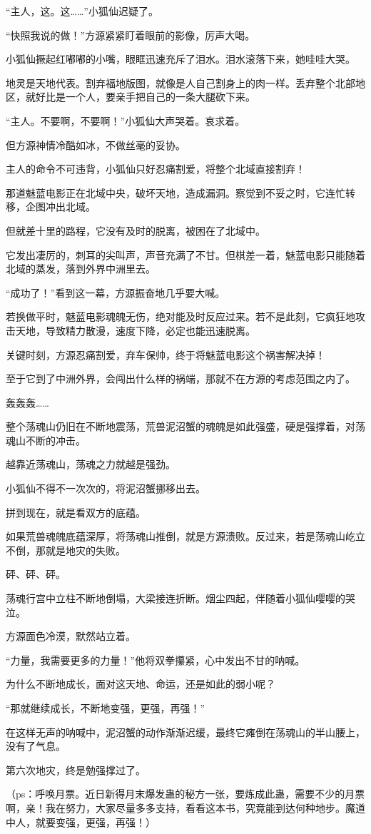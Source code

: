 \begin{this_body}
“主人，这。这……”小狐仙迟疑了。

“快照我说的做！”方源紧紧盯着眼前的影像，厉声大喝。

小狐仙撅起红嘟嘟的小嘴，眼眶迅速充斥了泪水。泪水滚落下来，她哇哇大哭。

地灵是天地代表。割弃福地版图，就像是人自己割身上的肉一样。丢弃整个北部地区，就好比是一个人，要亲手把自己的一条大腿砍下来。

“主人。不要啊，不要啊！”小狐仙大声哭着。哀求着。

但方源神情冷酷如冰，不做丝毫的妥协。

主人的命令不可违背，小狐仙只好忍痛割爱，将整个北域直接割弃！

那道魅蓝电影正在北域中央，破坏天地，造成漏洞。察觉到不妥之时，它连忙转移，企图冲出北域。

但就差十里的路程，它没有及时的脱离，被困在了北域中。

它发出凄厉的，刺耳的尖叫声，声音充满了不甘。但棋差一着，魅蓝电影只能随着北域的蒸发，落到外界中洲里去。

“成功了！”看到这一幕，方源振奋地几乎要大喊。

若换做平时，魅蓝电影魂魄无伤，绝对能及时反应过来。若不是此刻，它疯狂地攻击天地，导致精力散漫，速度下降，必定也能迅速脱离。

关键时刻，方源忍痛割爱，弃车保帅，终于将魅蓝电影这个祸害解决掉！

至于它到了中洲外界，会闯出什么样的祸端，那就不在方源的考虑范围之内了。

轰轰轰……

整个荡魂山仍旧在不断地震荡，荒兽泥沼蟹的魂魄是如此强盛，硬是强撑着，对荡魂山不断的冲击。

越靠近荡魂山，荡魂之力就越是强劲。

小狐仙不得不一次次的，将泥沼蟹挪移出去。

拼到现在，就是看双方的底蕴。

如果荒兽魂魄底蕴深厚，将荡魂山推倒，就是方源溃败。反过来，若是荡魂山屹立不倒，那就是地灾的失败。

砰、砰、砰。

荡魂行宫中立柱不断地倒塌，大梁接连折断。烟尘四起，伴随着小狐仙嘤嘤的哭泣。

方源面色冷漠，默然站立着。

“力量，我需要更多的力量！”他将双拳攥紧，心中发出不甘的呐喊。

为什么不断地成长，面对这天地、命运，还是如此的弱小呢？

“那就继续成长，不断地变强，更强，再强！”

在这样无声的呐喊中，泥沼蟹的动作渐渐迟缓，最终它瘫倒在荡魂山的半山腰上，没有了气息。

第六次地灾，终是勉强撑过了。

（ps：呼唤月票。近日新得月末爆发蛊的秘方一张，要炼成此蛊，需要不少的月票啊，亲！我在努力，大家尽量多多支持，看看这本书，究竟能到达何种地步。魔道中人，就要变强，更强，再强！）

\end{this_body}

